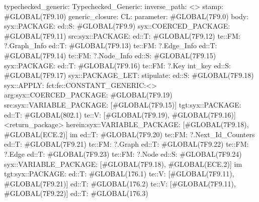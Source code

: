 typechecked_generic:
Typechecked_Generic:
inverse_path: <>
stamp: #GLOBAL(7F9.10)
generic_closure:
CL:
parameter: #GLOBAL(7F9.0)
body: syx::PACKAGE:
        ed::S: #GLOBAL(7F9.9)
            syx::COERCED_PACKAGE:
                #GLOBAL(7F9.11)
                 src:syx::PACKAGE:
                        ed::T: #GLOBAL(7F9.12) te::FM: ?.Graph_Info
                        ed::T: #GLOBAL(7F9.13) te::FM: ?.Edge_Info
                        ed::T: #GLOBAL(7F9.14) te::FM: ?.Node_Info
                        ed::S: #GLOBAL(7F9.15) syx::PACKAGE: ed::T: #GLOBAL(7F9.16) te::FM: ?.Key int_key
                            ed::S: #GLOBAL(7F9.17)
                                syx::PACKAGE_LET:
                                    stipulate:  ed::S: #GLOBAL(7F9.18)
                                                    syx::APPLY:
                                                        fct:fe::CONSTANT_GENERIC:<>
                                                        arg:syx::COERCED_PACKAGE:
                                                                #GLOBAL(7F9.19)
                                                                 src:syx::VARIABLE_PACKAGE:
                                                                 [#GLOBAL(7F9.15)]
                                                                tgt:syx::PACKAGE:
                                                                 ed::T: #GLOBAL(802.1) te::V: [#GLOBAL(7F9.19), #GLOBAL(7F9.16)]
                                                 <return_package>
                                    herein:syx::VARIABLE_PACKAGE:
                                     [#GLOBAL(7F9.18), #GLOBAL(ECE.2)]
                             im
                        ed::T: #GLOBAL(7F9.20) te::FM: ?.Next_Id_Counters
                            ed::T: #GLOBAL(7F9.21)
                             te::FM:
                             ?.Graph
                            ed::T: #GLOBAL(7F9.22)
                             te::FM:
                             ?.Edge
                            ed::T: #GLOBAL(7F9.23)
                             te::FM:
                             ?.Node
                    ed::S: #GLOBAL(7F9.24)
                     syx::VARIABLE_PACKAGE:
                     [#GLOBAL(7F9.18), #GLOBAL(ECE.2)]
                     im
                tgt:syx::PACKAGE:
                    ed::T: #GLOBAL(176.1)
                     te::V:
                     [#GLOBAL(7F9.11), #GLOBAL(7F9.21)]
                    ed::T: #GLOBAL(176.2)
                     te::V:
                     [#GLOBAL(7F9.11), #GLOBAL(7F9.22)]
                    ed::T: #GLOBAL(176.3)
